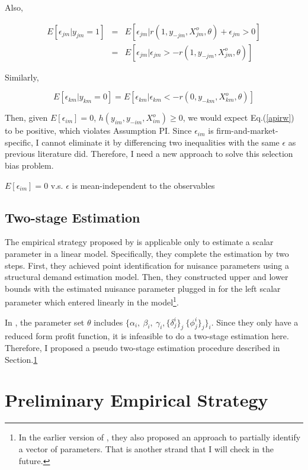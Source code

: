 \documentclass[a4paper]{article}
\begin{document}
Also,

\begin{eqnarray}
E[\epsilon_{jm}|y_{jm}=1]&=&E[\epsilon_{jm}|r(1,y_{-jm},X^o_{jm},\theta)+\epsilon_{jm}>0]\nonumber\\
&=&E[\epsilon_{jm}|\epsilon_{jm}>-r(1,y_{-jm},X^o_{jm},\theta)] \nonumber
\end{eqnarray}

Similarly,


\begin{equation}
E[\epsilon_{km}|y_{km}=0]=E[\epsilon_{km}|\epsilon_{km}<-r(0,y_{-km},X^o_{km},\theta)] \nonumber
\end{equation}

Then, given $E[\epsilon_{im}]=0$, $h(y_{im},y_{-im},X^o_{im}) \geq 0$, we would expect Eq.(\ref{apirw}) to be positive, which violates Assumption PI. Since $\epsilon_{im}$ is firm-and-market-specific, I cannot eliminate it by differencing two inequalities with the same $\epsilon$ as previous literature did. Therefore, I need a new approach to solve this selection bias problem.

{\color{orange}$E[\epsilon_{im}]=0$ v.s. $\epsilon$ is mean-independent to the observables}

\subsection{Two-stage Estimation}

The empirical strategy proposed by \cite{pakes2015moment} is applicable only to estimate a scalar parameter in a linear model. Specifically, they complete the estimation by two steps. First, they achieved point identification for nuisance parameters using a structural demand estimation model. Then, they constructed upper and lower bounds with the estimated nuisance parameter plugged in for the left scalar parameter which entered linearly in the model\footnote{In the earlier version of \cite{pakes2015moment}, they also proposed an approach to partially identify a vector of parameters. That is another strand that I will check in the future.}. 

In \cite{ciliberto2009market}, the parameter set $\theta$ includes $\{\alpha_i,\ \beta_i, \ \gamma_i, \{\delta_{j}^i\}_j \ \{\phi_j^i\}_j\}_i$. Since they only have a reduced form profit function, it is infeasible to do a two-stage estimation here. Therefore, I proposed a pseudo two-stage estimation procedure described in Section.\ref{es}


\section{Preliminary Empirical Strategy}\label{es}
\end{document}
